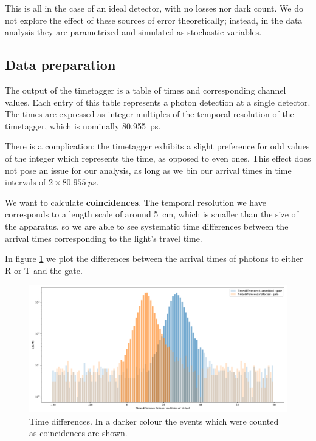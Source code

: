 \documentclass[main.tex]{subfiles}
\begin{document}
This is all in the case of an ideal detector, with no losses nor dark count. We do not explore the effect of these sources of error theoretically; instead, in the data analysis they are parametrized and simulated as stochastic variables. 

\subsection{Data preparation}

The output of the timetagger is a table of times and corresponding channel values.
Each entry of this table represents a photon detection at a single detector.
The times are expressed as integer multiples of the temporal resolution of the timetagger, which is nominally \SI{80.955}{ps}.

There is a complication: the timetagger exhibits a slight preference for odd values of the integer which represents the time, as opposed to even ones. This effect does not pose an issue for our analysis, as long as we bin our arrival times in time intervals of \(2 \times \SI{80.955}{ps}\). 

We want to calculate \textbf{coincidences}. The temporal resolution we have corresponds to a length scale of around \SI{5}{cm}, which is smaller than the size of the apparatus, so we are able to see systematic time differences between the arrival times corresponding to the light's travel time. 

In figure \ref{fig:single_photon_timedifferences} we plot the differences between the arrival times of photons to either R or T and the gate. 

\begin{figure}[ht]
\centering
\includegraphics[width=\textwidth]{figures/single_photon_timedifferences}
\caption{Time differences. In a darker colour the events which were counted as coincidences are shown.}
\label{fig:single_photon_timedifferences}
\end{figure}
\end{document}
